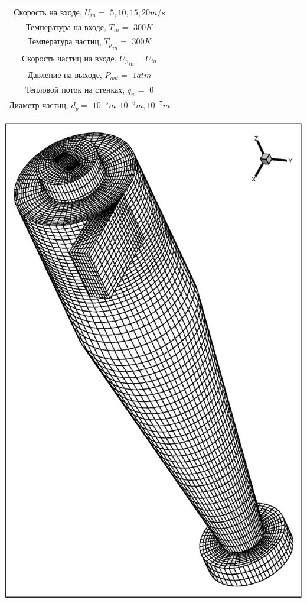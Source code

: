 \begin{minipage}{0.6\textwidth}
    \label{cycloneBC}
	\begin{tabular}{c}
		\hline
		\label{geometrytable}
		Скорость на входе, $U_{in}=$  $5, 10, 15, 20 m/s$ \\
		Температура на входе, $T_{in}=$  $300 K$ \\
		Температура частиц, ${T_p}_{in}=$  $300 K$ \\
		Скорость частиц на входе, ${U_p}_{in} = U_{in}$ \\
		Давление на выходе, $P_{out}=$  $1atm$ \\
		Тепловой поток на стенках, $q_w=$  $0$ \\
		Диаметр частиц, $d_p=$ $10^{-5}m, 10^{-6}m, 10^{-7}	m$\\
	\end{tabular}
\end{minipage}
\hspace{1em}
\begin{minipage}{0.35\textwidth}
    \includegraphics[scale=0.45]{meshCyclone}
	\label{fig:cycloneMesh}
\end{minipage}
\vspace{1em}  
